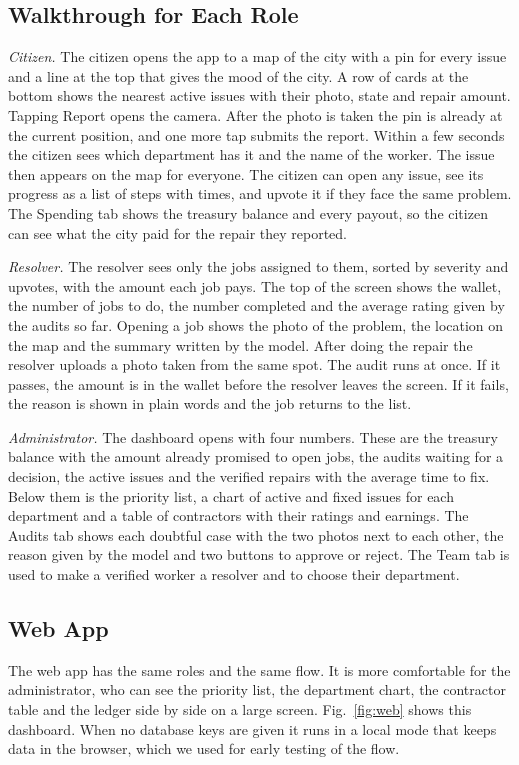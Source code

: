 \documentclass[conference,a4paper]{IEEEtran}
\begin{document}
\subsection{Walkthrough for Each Role}
\textit{Citizen.} The citizen opens the app to a map of the city with a pin for every issue and a line at the top that gives the mood of the city. A row of cards at the bottom shows the nearest active issues with their photo, state and repair amount. Tapping Report opens the camera. After the photo is taken the pin is already at the current position, and one more tap submits the report. Within a few seconds the citizen sees which department has it and the name of the worker. The issue then appears on the map for everyone. The citizen can open any issue, see its progress as a list of steps with times, and upvote it if they face the same problem. The Spending tab shows the treasury balance and every payout, so the citizen can see what the city paid for the repair they reported.

\textit{Resolver.} The resolver sees only the jobs assigned to them, sorted by severity and upvotes, with the amount each job pays. The top of the screen shows the wallet, the number of jobs to do, the number completed and the average rating given by the audits so far. Opening a job shows the photo of the problem, the location on the map and the summary written by the model. After doing the repair the resolver uploads a photo taken from the same spot. The audit runs at once. If it passes, the amount is in the wallet before the resolver leaves the screen. If it fails, the reason is shown in plain words and the job returns to the list.

\textit{Administrator.} The dashboard opens with four numbers. These are the treasury balance with the amount already promised to open jobs, the audits waiting for a decision, the active issues and the verified repairs with the average time to fix. Below them is the priority list, a chart of active and fixed issues for each department and a table of contractors with their ratings and earnings. The Audits tab shows each doubtful case with the two photos next to each other, the reason given by the model and two buttons to approve or reject. The Team tab is used to make a verified worker a resolver and to choose their department.

\subsection{Web App}
The web app has the same roles and the same flow. It is more comfortable for the administrator, who can see the priority list, the department chart, the contractor table and the ledger side by side on a large screen. Fig.~\ref{fig:web} shows this dashboard. When no database keys are given it runs in a local mode that keeps data in the browser, which we used for early testing of the flow.
\end{document}
